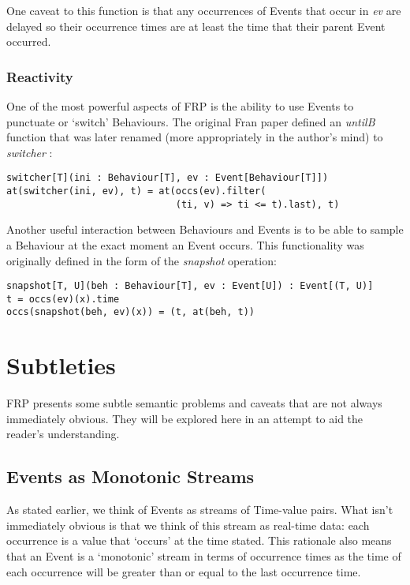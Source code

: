       One caveat to this function is that any occurrences of Events that occur in \emph{ev} are delayed
      so their occurrence times are at least the time that their parent Event occurred.
        
      \subsubsection{Reactivity}
        One of the most powerful aspects of FRP is the ability to use Events to punctuate or `switch' Behaviours.
        The original Fran paper defined an \emph{untilB} function that was later renamed (more appropriately in the
        author's mind) to \emph{switcher} \cite{Elliott2009}:

\begin{verbatim}
switcher[T](ini : Behaviour[T], ev : Event[Behaviour[T]])
at(switcher(ini, ev), t) = at(occs(ev).filter(
                              (ti, v) => ti <= t).last), t)
\end{verbatim}

        Another useful interaction between Behaviours and Events is to be able to sample
        a Behaviour at the exact moment an Event occurs. This functionality was originally defined in the
        form of the \emph{snapshot} operation:

\begin{verbatim}
snapshot[T, U](beh : Behaviour[T], ev : Event[U]) : Event[(T, U)]
t = occs(ev)(x).time
occs(snapshot(beh, ev)(x)) = (t, at(beh, t))
\end{verbatim} 
  
  \section{Subtleties}
    FRP presents some subtle semantic problems and caveats that are not always immediately obvious.
    They will be explored here in an attempt to aid the reader's understanding.
     
    \subsection{Events as Monotonic Streams}
      As stated earlier, we think of Events as streams of Time-value pairs. What isn't immediately
      obvious is that we think of this stream as real-time data: each occurrence is a value that
      `occurs' at the time stated. This rationale also means that an Event is a `monotonic' stream in terms of
      occurrence times as the time of each occurrence will be greater than or equal to the last occurrence
      time.
      
